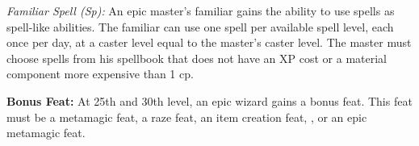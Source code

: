 \textit{Familiar Spell (Sp):} An epic master's familiar gains the ability to use spells as spell-like abilities. The familiar can use one spell per available spell level, each once per day, at a caster level equal to the master's caster level. The master must choose spells from his spellbook that does not have an XP cost or a material component more expensive than 1 cp.

\textbf{Bonus Feat:} At 25th and 30th level, an epic wizard gains a bonus feat. This feat must be a metamagic feat, a raze feat, an item creation feat, , or an epic metamagic feat.
